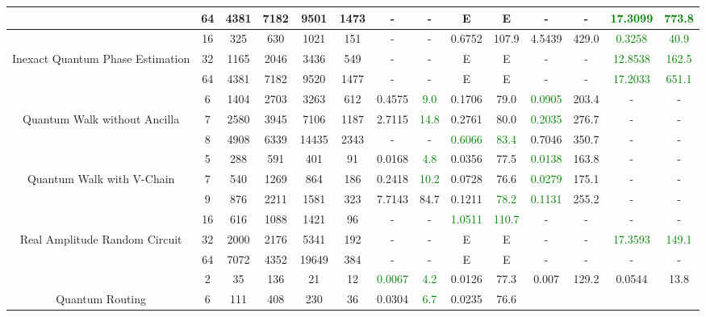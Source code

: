 \begin{table}[htb]
{\begin{tabular}{|c|c|c|c|c|c|c|c|c|c|c|c|c|c|}
 \\
 & 
64 & 4381 & 7182 & 9501 & 1473
 & - & -
 & E & E
 & - & -
 & \textcolor{green}{17.3099} & \textcolor{green}{773.8}
 \\
\hline
 & 
16 & 325 & 630 & 1021 & 151
 & - & -
 & 0.6752 & 107.9
 & 4.5439 & 429.0
 & \textcolor{green}{0.3258} & \textcolor{green}{40.9}
 \\
Inexact Quantum Phase Estimation & 
32 & 1165 & 2046 & 3436 & 549
 & - & -
 & E & E
 & - & -
 & \textcolor{green}{12.8538} & \textcolor{green}{162.5}
 \\
 & 
64 & 4381 & 7182 & 9520 & 1477
 & - & -
 & E & E
 & - & -
 & \textcolor{green}{17.2033} & \textcolor{green}{651.1}
 \\
\hline
 & 
6 & 1404 & 2703 & 3263 & 612
 & 0.4575 & \textcolor{green}{9.0}
 & 0.1706 & 79.0
 & \textcolor{green}{0.0905} & 203.4
 & - & -
 \\
Quantum Walk without Ancilla & 
7 & 2580 & 3945 & 7106 & 1187
 & 2.7115 & \textcolor{green}{14.8}
 & 0.2761 & 80.0
 & \textcolor{green}{0.2035} & 276.7
 & - & -
 \\
 & 
8 & 4908 & 6339 & 14435 & 2343
 & - & -
 & \textcolor{green}{0.6066} & \textcolor{green}{83.4}
 & 0.7046 & 350.7
 & - & -
 \\
\hline
 & 
5 & 288 & 591 & 401 & 91
 & 0.0168 & \textcolor{green}{4.8}
 & 0.0356 & 77.5
 & \textcolor{green}{0.0138} & 163.8
 & - & -
 \\
Quantum Walk with V-Chain & 
7 & 540 & 1269 & 864 & 186
 & 0.2418 & \textcolor{green}{10.2}
 & 0.0728 & 76.6
 & \textcolor{green}{0.0279} & 175.1
 & - & -
 \\
 & 
9 & 876 & 2211 & 1581 & 323
 & 7.7143 & 84.7
 & 0.1211 & \textcolor{green}{78.2}
 & \textcolor{green}{0.1131} & 255.2
 & - & -
 \\
\hline
 & 
16 & 616 & 1088 & 1421 & 96
 & - & -
 & \textcolor{green}{1.0511} & \textcolor{green}{110.7}
 & - & -
 & - & -
 \\
Real Amplitude Random Circuit & 
32 & 2000 & 2176 & 5341 & 192
 & - & -
 & E & E
 & - & -
 & \textcolor{green}{17.3593} & \textcolor{green}{149.1}
 \\
 & 
64 & 7072 & 4352 & 19649 & 384
 & - & -
 & E & E
 & - & -
 & - & -
 \\
\hline
 & 
2 & 35 & 136 & 21 & 12
 & \textcolor{green}{0.0067} & \textcolor{green}{4.2}
 & 0.0126 & 77.3
 & 0.007 & 129.2
 & 0.0544 & 13.8
 \\
Quantum Routing & 
6 & 111 & 408 & 230 & 36
 & 0.0304 & \textcolor{green}{6.7}
 & 0.0235 & 76.6

\end{tabular}}
\end{table}
